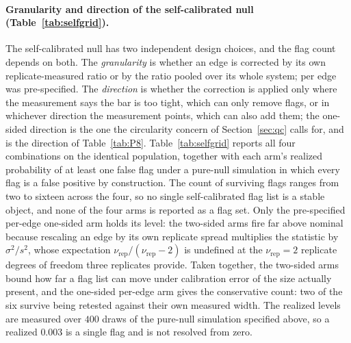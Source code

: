 \paragraph{Granularity and direction of the self-calibrated null (Table~\ref{tab:selfgrid}).}
The self-calibrated null has two independent design choices, and the flag count depends on both.
The \emph{granularity} is whether an edge is corrected by its own replicate-measured ratio or by
the ratio pooled over its whole system; per edge was pre-specified. The \emph{direction} is
whether the correction is applied only where the measurement says the bar is too tight, which can
only remove flags, or in whichever direction the measurement points, which can also add them; the
one-sided direction is the one the circularity concern of Section~\ref{sec:qc} calls for, and is
the direction of Table~\ref{tab:P8}. Table~\ref{tab:selfgrid} reports all four combinations on the
identical population, together with each arm's realized probability of at least one false flag
under a pure-null simulation in which every flag is a false positive by construction. The count of surviving flags ranges from two to sixteen across the four, so no
single self-calibrated flag list is a stable object, and none of the four arms is reported as a
flag set. Only the pre-specified per-edge one-sided arm holds its level: the two-sided arms fire far above
nominal because rescaling an edge by its own replicate spread multiplies the statistic by
$\sigma^2/s^2$, whose expectation $\nu_{\text{rep}}/(\nu_{\text{rep}}-2)$ is undefined at the
$\nu_{\text{rep}}=2$ replicate degrees of freedom three replicates provide. Taken together, the two-sided arms bound how far a flag list can move
under calibration error of the size actually present, and the one-sided per-edge arm gives the
conservative count: two of the six survive being retested against their own measured width. The
realized levels are measured over $400$ draws of the pure-null simulation specified above, so a
realized $0.003$ is a single flag and is not resolved from zero.

